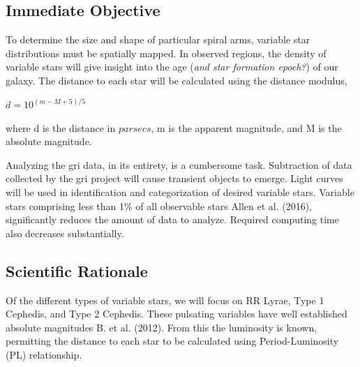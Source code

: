 \documentclass[letterpaper,11pt]{article}
\begin{document}
\subsection{Immediate Objective}
To determine the size and shape of particular spiral arms, variable star distributions must be spatially mapped.  
In observed regions, the density of variable stars will give insight into the age (\textit{and star formation epoch?}) of our galaxy.  The distance to each star will be calculated using the distance modulus,
\begin{center}
$d = 10^{(m - M + 5)/5}$
\end{center}
where d is the distance in $parsecs$, m is the apparent magnitude, and M is the absolute magnitude.




Analyzing the gri data, in its entirety, is a cumbersome task.  Subtraction of data collected by the gri project will cause transient objects to emerge.  
Light curves will be used in identification and categorization of desired variable stars.
Variable stars comprising less than 1\% of all observable stars Allen et al. (2016), significantly reduces the amount of data to analyze.  Required computing time also decreases substantially.


\subsection{Scientific Rationale}
Of the different types of variable stars, we will focus on RR Lyrae, Type 1 Cephedis, and Type 2 Cephedis.  These pulsating variables have well established absolute magnitudes B. et al. (2012).  From this the luminosity is known, permitting the distance to each star to be calculated using Period-Luminosity (PL) relationship.
\end{document}
